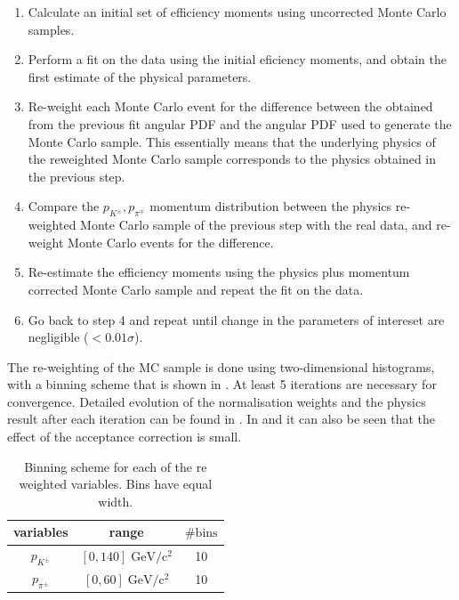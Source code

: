 \begin{enumerate}
\item Calculate an initial set of efficiency moments using uncorrected \BdJpsiKst Monte Carlo samples.
\item Perform a fit on the \BsJpsiKst data using the initial eficiency moments, and obtain the first estimate of the physical parameters.
\item Re-weight each Monte Carlo event for the difference between the obtained from the previous fit angular PDF and the angular PDF used to generate the Monte Carlo sample. 
      This essentially means that the underlying physics of the reweighted Monte Carlo sample corresponds to the physics obtained in the previous step.
\item Compare the $p_{K^{\pm}},p_{\pi^{\mp}}$ momentum distribution between the physics re-weighted Monte Carlo sample of the previous step with the 
      real data, and re-weight Monte Carlo events for the difference.
\item Re-estimate the efficiency moments using the physics plus momentum corrected \BdJpsiKst Monte Carlo sample and repeat the fit on the \BsJpsiKst data.
\item Go back to step 4 and repeat until change in the parameters of intereset are negligible ($<0.01\sigma$).
\end{enumerate} 


The re-weighting of the MC sample is done using two-dimensional histograms, with a binning scheme that is shown in . 
At least 5 iterations are necessary for convergence. Detailed evolution of the normalisation weights and the physics result after each iteration
can be found in \appref{}. In \tabref{} and \figref{} it can also be seen that the effect of the acceptance correction is small.

\begin{table}[!h]
  \center
  \caption{\small Binning scheme for each of the re weighted variables. Bins have equal width.}
  \begin{tabular}{c c c}
    \hline
     variables & range & $\# \text{bins}$ \\
    \hline
    $p_{K^{\pm}}$    &  $[0,140]    \;  \text{GeV}/\text{c}^2$  & 10      \\ 
    $p_{\pi^{\pm}}$  &  $[0,60]      \;  \text{GeV}/\text{c}^2$  & 10      \\ 
    \hline
  \end{tabular}
  \label{angAccBinning}
\end{table}


